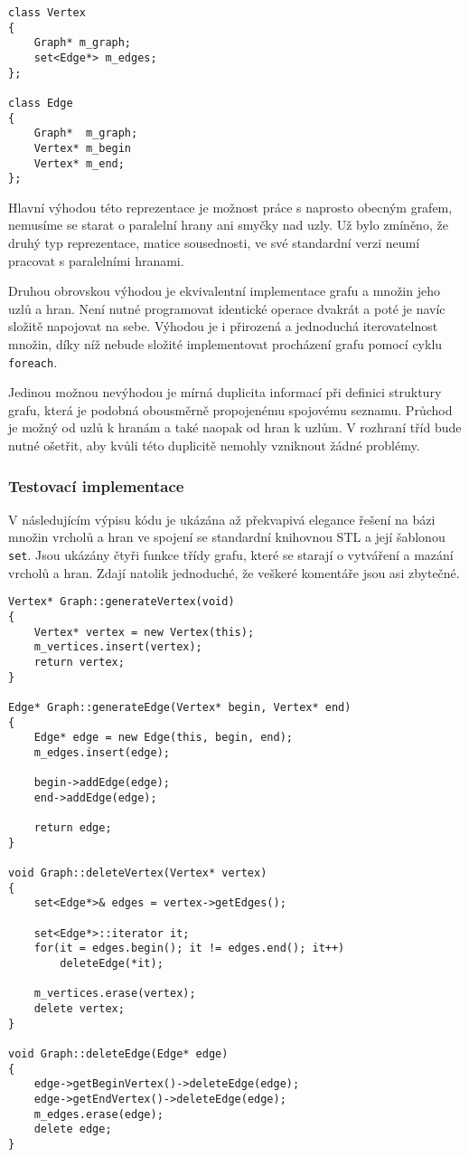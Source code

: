 \documentclass[11pt,twoside,a4paper]{book}
\begin{document}
\begin{verbatim}
class Vertex
{
    Graph* m_graph;
    set<Edge*> m_edges;
};

class Edge
{
    Graph*  m_graph;
    Vertex* m_begin
    Vertex* m_end;
};
\end{verbatim}

Hlavní výhodou této reprezentace je možnost práce s naprosto obecným grafem, nemusíme se starat o paralelní hrany ani smyčky nad uzly. Už bylo zmíněno, že druhý typ reprezentace, matice sousednosti, ve své standardní verzi neumí pracovat s paralelními hranami.

Druhou obrovskou výhodou je ekvivalentní implementace grafu a množin jeho uzlů a hran. Není nutné programovat identické operace dvakrát a poté je navíc složitě napojovat na sebe. Výhodou je i přirozená a jednoduchá iterovatelnost množin, díky níž nebude složité implementovat procházení grafu pomocí cyklu \texttt{foreach}.

Jedinou možnou nevýhodou je mírná duplicita informací při definici struktury gra\-fu, která je podobná obousměrně propojenému spojovému seznamu. Průchod je možný od uzlů k hranám a také naopak od hran k uzlům. V rozhraní tříd bude nutné ošetřit, aby kvůli této duplicitě nemohly vzniknout žádné problémy.


\subsubsection{Testovací implementace}

V následujícím výpisu kódu je ukázána až překvapivá elegance řešení na bázi množin vrcholů a hran ve spojení se standardní knihovnou STL a její šablonou \texttt{set}. Jsou ukázány čtyři funkce třídy grafu, které se starají o vytváření a mazání vrcholů a hran. Zdají natolik jednoduché, že veškeré komentáře jsou asi zbytečné.

\begin{verbatim}
Vertex* Graph::generateVertex(void)
{
    Vertex* vertex = new Vertex(this);
    m_vertices.insert(vertex);
    return vertex;
}

Edge* Graph::generateEdge(Vertex* begin, Vertex* end)
{
    Edge* edge = new Edge(this, begin, end);
    m_edges.insert(edge);

    begin->addEdge(edge);
    end->addEdge(edge);

    return edge;
}

void Graph::deleteVertex(Vertex* vertex)
{
    set<Edge*>& edges = vertex->getEdges();

    set<Edge*>::iterator it;
    for(it = edges.begin(); it != edges.end(); it++)
        deleteEdge(*it);

    m_vertices.erase(vertex);
    delete vertex;
}

void Graph::deleteEdge(Edge* edge)
{
    edge->getBeginVertex()->deleteEdge(edge);
    edge->getEndVertex()->deleteEdge(edge);
    m_edges.erase(edge);
    delete edge;
}
\end{verbatim}
\end{document}
